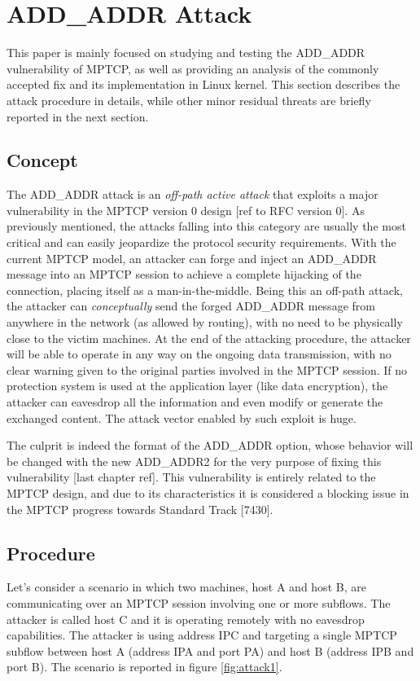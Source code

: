 \section{ADD\_ADDR Attack} \label{theaddaddrattack}
This paper is mainly focused on studying and testing the ADD\_ADDR vulnerability of MPTCP, as well as providing an analysis of the commonly accepted fix and its implementation in Linux kernel. This section describes the attack procedure in details, while other minor residual threats are briefly reported in the next section.

\subsection{Concept}
The ADD\_ADDR attack is an \textit{off-path active attack} that exploits a major vulnerability in the MPTCP version 0 design [ref to RFC version 0]. As previously mentioned, the attacks falling into this category are usually the most critical and can easily jeopardize the protocol security requirements.
With the current MPTCP model, an attacker can forge and inject an ADD\_ADDR message into an MPTCP session to achieve a complete hijacking of the connection, placing itself as a man-in-the-middle. Being this an off-path attack, the attacker can \textit{conceptually} send the forged ADD\_ADDR message from anywhere in the network (as allowed by routing), with no need to be physically close to the victim machines. At the end of the attacking procedure, the attacker will be able to operate in any way on the ongoing data transmission, with no clear warning given to the original parties involved in the MPTCP session.
If no protection system is used at the application layer (like data encryption), the attacker can eavesdrop all the information and even modify or generate the exchanged content. The attack vector enabled by such exploit is huge.


The culprit is indeed the format of the ADD\_ADDR option, whose behavior will be changed with the new ADD\_ADDR2 for the very purpose of fixing this vulnerability [last chapter ref].
This vulnerability is entirely related to the MPTCP design, and due to its characteristics it is considered a blocking issue in the MPTCP progress towards Standard Track [7430].

\subsection{Procedure}
Let's consider a scenario in which two machines, host A and host B, are communicating over an MPTCP session involving one or more subflows. The attacker is called host C and it is operating remotely with no eavesdrop capabilities. The attacker is using address IPC and targeting a single MPTCP subflow between host A (address IPA and port PA) and host B (address IPB and port B). The scenario is reported in figure \ref{fig:attack1}.

